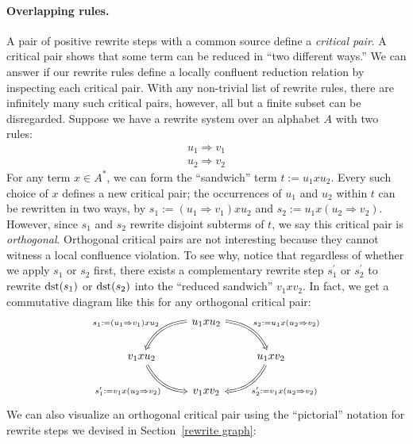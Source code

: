 \documentclass[../generics]{subfiles}
\begin{document}
\paragraph{Overlapping rules.} A pair of positive rewrite steps with a common source define a \emph{critical pair}. A critical pair shows that some term can be reduced in ``two different ways.'' We can answer if our rewrite rules define a locally confluent reduction relation by inspecting each critical pair. With any non-trivial list of rewrite rules, there are infinitely many such critical pairs, however, all but a finite subset can be disregarded. Suppose we have a rewrite system over an alphabet $A$ with two rules:
\begin{gather*}
u_1\Rightarrow v_1\\
u_2\Rightarrow v_2
\end{gather*}
For any term $x\in A^*$, we can form the ``sandwich'' term $t := u_1xu_2$. Every such choice of $x$ defines a new critical pair; the occurrences of $u_1$ and $u_2$ within $t$ can be rewritten in two ways, by $s_1 := (u_1\Rightarrow v_1)xu_2$ and $s_2 := u_1x(u_2\Rightarrow v_2)$. However, since $s_1$ and $s_2$ rewrite disjoint subterms of $t$, we say this critical pair is \emph{orthogonal}. Orthogonal critical pairs are not interesting because they cannot witness a local confluence violation. To see why, notice that regardless of whether we apply $s_1$ or $s_2$ first, there exists a complementary rewrite step $s_1^\prime$ or $s_2^\prime$ to rewrite $\operatorname{dst}(s_1)$ or $\operatorname{dst}(s_2)$ into the ``reduced sandwich'' $v_1xv_2$. In fact, we get a commutative diagram like this for any orthogonal critical pair:
\[
\begin{tikzcd}
&u_1xu_2\arrow[ld, Rightarrow, "s_1:=(u_1\Rightarrow v_1)xu_2"', bend right]\arrow[rd, Rightarrow, "s_2:=u_1x(u_2\Rightarrow v_2)", bend left]\\
v_1xu_2\arrow[rd, Rightarrow, "s_1^\prime := v_1x(u_2\Rightarrow v_2)"', bend right]&&u_1xv_2\arrow[ld, Rightarrow, "s_2^\prime:=v_1x(u_2\Rightarrow v_2)", bend left]\\
&v_1xv_2
\end{tikzcd}
\]
We can also visualize an orthogonal critical pair using the ``pictorial'' notation for rewrite steps we devised in Section~\ref{rewrite graph}:
\end{document}
